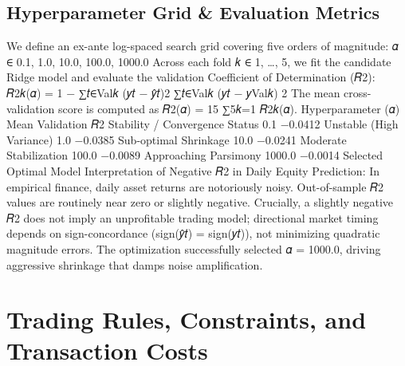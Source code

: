 \documentclass[12pt, a4paper]{article}
\begin{document}
\subsection{Hyperparameter Grid \& Evaluation Metrics}
We define an ex-ante log-spaced search grid covering five orders of magnitude:
𝛼 ∈ {0.1, 1.0, 10.0, 100.0, 1000.0}
Across each fold 𝑘 ∈ {1, …, 5}, we fit the candidate Ridge model and evaluate the validation Coefficient 
of Determination (𝑅2):
𝑅2𝑘(𝛼) = 1 − ∑𝑡∈Val𝑘 (𝑦𝑡 − 𝑦̂𝑡)2
∑𝑡∈Val𝑘 (𝑦𝑡 − 𝑦Val𝑘)
2
The mean cross-validation score is computed as 𝑅2(𝛼) = 15 ∑5𝑘=1 𝑅2𝑘(𝛼).
Hyperparameter (𝛼) Mean Validation 𝑅2 Stability / Convergence Status
0.1 −0.0412 Unstable (High Variance)
1.0 −0.0385 Sub-optimal Shrinkage
10.0 −0.0241 Moderate Stabilization
100.0 −0.0089 Approaching Parsimony
1000.0 −0.0014 Selected Optimal Model
Interpretation of Negative 𝑅2 in Daily Equity Prediction:  In empirical finance, daily asset returns 
are notoriously noisy. Out-of-sample 𝑅2 values are routinely near zero or slightly negative. Crucially, a 
slightly negative 𝑅2 does not imply an unprofitable trading model; directional market timing depends on 
sign-concordance (sign(𝑦̂𝑡) = sign(𝑦𝑡)), not minimizing quadratic magnitude errors. The optimization 
successfully selected 𝛼 = 1000.0, driving aggressive shrinkage that damps noise amplification.

\section{Trading Rules, Constraints, and Transaction Costs}
\end{document}
